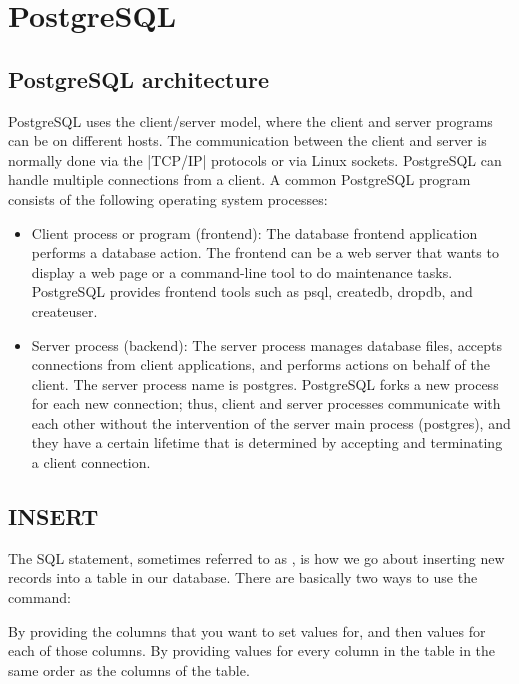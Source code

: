 
\chapter{PostgreSQL}

\section{PostgreSQL architecture}

PostgreSQL uses the client/server model, where the client and server programs can
be on different hosts. The communication between the client and server is normally
done via the |TCP/IP| protocols or via Linux sockets. PostgreSQL can handle multiple
connections from a client. A common PostgreSQL program consists of the following
operating system processes:

\begin{itemize}

\item Client process or program (frontend): The database frontend application
performs a database action. The frontend can be a web server that wants
to display a web page or a command-line tool to do maintenance tasks.
PostgreSQL provides frontend tools such as psql, createdb, dropdb,
and createuser.

\item Server process (backend): The server process manages database files, accepts
connections from client applications, and performs actions on behalf of the
client. The server process name is postgres.
PostgreSQL forks a new process for each new connection; thus, client and server
processes communicate with each other without the intervention of the server main
process (postgres), and they have a certain lifetime that is determined by accepting
and terminating a client connection.

\end{itemize}


\section{INSERT}

The SQL  statement, sometimes referred to as , is how we go about inserting new records into a table in our database. There are basically two ways to use the command:

By providing the columns that you want to set values for, and then values for each of those columns.
By providing values for every column in the table in the same order as the columns of the table.

